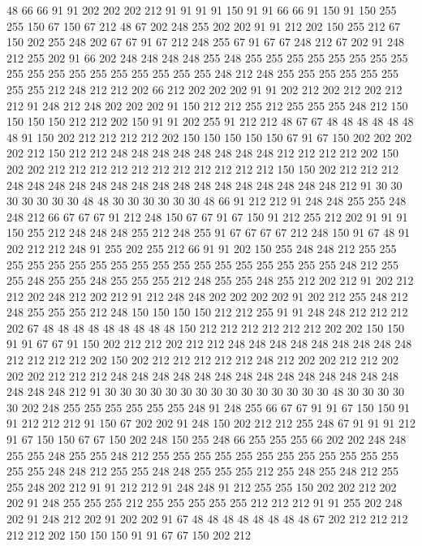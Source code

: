 48 66 66 91 91 202 202 202 212 91 91 91 91 150 91 91 66 66 91 150
91 150 255 255 150 67 150 67 212 48 67 202 248 255 202 202 91 91 212 202
150 255 212 67 150 202 255 248 202 67 67 91 67 212 248 255 67 91 67 67
248 212 67 202 91 248 212 255 202 91 66 202 248 248 248 248 255 248 255 255
255 255 255 255 255 255 255 255 255 255 255 255 255 255 255 255 248 212 248 255
255 255 255 255 255 255 255 212 248 212 212 202 66 212 202 202 202 91 91 202
212 202 212 202 212 212 91 248 212 248 202 202 202 91 150 212 212 255 212 255
255 255 248 212 150 150 150 150 212 212 202 150 91 91 202 255 91 212 212 48
67 67 48 48 48 48 48 48 48 91 150 202 212 212 212 212 202 150 150 150
150 150 67 91 67 150 202 202 202 202 212 150 212 212 248 248 248 248 248 248
248 248 212 212 212 212 202 150 202 202 212 212 212 212 212 212 212 212 212 212
212 150 150 202 212 212 212 248 248 248 248 248 248 248 248 248 248 248 248 248
248 248 248 212 91 30 30 30 30 30 30 30 48 48 30 30 30 30 30 30
48 66 91 212 212 91 248 248 255 255 248 248 212 66 67 67 67 91 212 248
150 67 67 91 67 150 91 212 255 212 202 91 91 91 150 255 212 248 248 248
255 212 248 255 91 67 67 67 67 212 248 150 91 67 48 91 202 212 212 248
91 255 202 255 212 66 91 91 202 150 255 248 248 212 255 255 255 255 255 255
255 255 255 255 255 255 255 255 255 255 255 255 248 212 255 255 248 255 255 248
255 255 255 212 248 255 255 248 255 212 202 212 91 202 212 212 202 248 212 202
212 91 212 248 248 202 202 202 202 91 202 212 255 248 212 248 255 255 255 212
248 150 150 150 150 212 212 255 91 91 248 248 212 212 212 202 67 48 48 48
48 48 48 48 48 48 150 212 212 212 212 212 212 202 202 150 150 91 91 67
67 91 150 202 212 212 202 212 212 248 248 248 248 248 248 248 248 248 212 212
212 212 202 150 202 212 212 212 212 212 248 212 202 202 212 212 202 202 202 212
212 212 248 248 248 248 248 248 248 248 248 248 248 248 248 248 248 248 248 212
91 30 30 30 30 30 30 30 30 30 30 30 30 30 30 30 48 30 30 30
30 30 202 248 255 255 255 255 255 255 248 91 248 255 66 67 67 91 91 67
150 150 91 91 212 212 212 91 150 67 202 202 91 248 150 202 212 212 255 248
67 91 91 91 212 91 67 150 150 67 67 150 202 248 150 255 248 66 255 255
255 66 202 202 248 248 255 255 248 255 255 248 212 255 255 255 255 255 255 255
255 255 255 255 255 255 255 248 248 212 255 255 248 248 255 255 255 212 255 248
255 248 212 255 255 248 202 212 91 91 212 212 91 248 248 91 212 255 255 150
202 202 212 202 202 91 248 255 255 255 212 255 255 255 255 255 212 212 212 91
91 255 202 248 202 91 248 212 202 91 202 202 91 67 48 48 48 48 48 48
48 48 67 202 212 212 212 212 212 202 150 150 150 91 91 67 67 150 202 212
